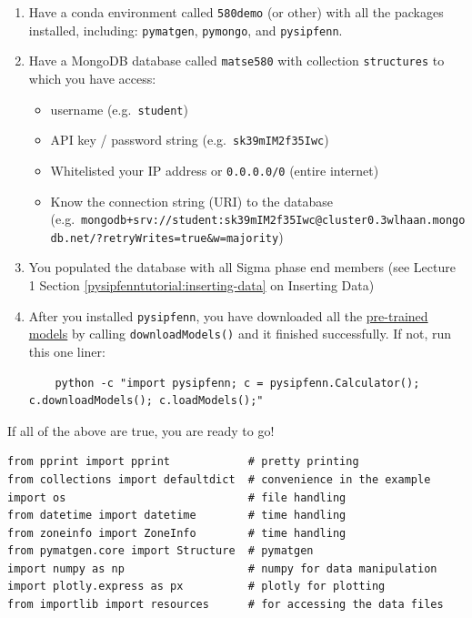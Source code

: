 \begin{enumerate}
    \item Have a conda environment called \texttt{580demo} (or other) with all the packages installed, including: \texttt{pymatgen}, \texttt{pymongo}, and \texttt{pysipfenn}.

    \item Have a MongoDB database called \texttt{matse580} with collection \texttt{structures} to which you have access:
    \begin{itemize}
      \item username (e.g.~\texttt{student})
      \item API key / password string
        (e.g.~\texttt{sk39mIM2f35Iwc})
      \item Whitelisted your IP address or \texttt{0.0.0.0/0}
        (entire internet)
      \item Know the connection string (URI) to the database
        (e.g.~\texttt{mongodb+srv://student:sk39mIM2f35Iwc@cluster0.3wlhaan.mongodb.net/?retryWrites=true\&w=majority})
    \end{itemize}

    \item You populated the database with all Sigma phase end members (see Lecture 1 Section \ref{pysipfenntutorial:inserting-data} on Inserting Data)

    \item After you installed \texttt{pysipfenn}, you have downloaded all the \href{https://zenodo.org/records/7373089}{pre-trained models} by calling \texttt{downloadModels()} and it finished successfully. If not, run this one liner:
    \begin{verbatim}
    python -c "import pysipfenn; c = pysipfenn.Calculator(); c.downloadModels(); c.loadModels();"
    \end{verbatim}
\end{enumerate}


If all of the above are true, you are ready to go!

\begin{verbatim}
from pprint import pprint            # pretty printing
from collections import defaultdict  # convenience in the example
import os                            # file handling
from datetime import datetime        # time handling
from zoneinfo import ZoneInfo        # time handling
from pymatgen.core import Structure  # pymatgen
import numpy as np                   # numpy for data manipulation
import plotly.express as px          # plotly for plotting
from importlib import resources      # for accessing the data files
\end{verbatim}

